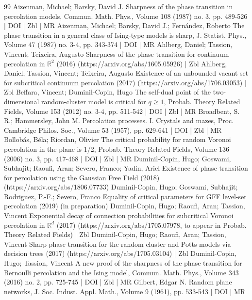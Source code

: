 \begin{thebibliography}{99}
Aizenman, Michael; Barsky, David J. Sharpness of the phase transition in percolation models, Commun. Math. Phys., Volume 108 (1987) no. 3, pp. 489-526 | DOI | Zbl | MR
Aizenman, Michael; Barsky, David J.; Fernández, Roberto The phase transition in a general class of Ising-type models is sharp, J. Statist. Phys., Volume 47 (1987) no. 3-4, pp. 343-374 | DOI | MR
Ahlberg, Daniel; Tassion, Vincent; Teixeira, Augusto Sharpness of the phase transition for continuum percolation in $\mathbb{R}^2$ (2016) (https://arxiv.org/abs/1605.05926) | Zbl
Ahlberg, Daniel; Tassion, Vincent; Teixeira, Augusto Existence of an unbounded vacant set for subcritical continuum percolation (2017) (https://arxiv.org/abs/1706.03053) | Zbl
Beffara, Vincent; Duminil-Copin, Hugo The self-dual point of the two-dimensional random-cluster model is critical for $q\ge 1$, Probab. Theory Related Fields, Volume 153 (2012) no. 3-4, pp. 511-542 | DOI | Zbl | MR
Broadbent, S. R.; Hammersley, John M. Percolation processes. I. Crystals and mazes, Proc. Cambridge Philos. Soc., Volume 53 (1957), pp. 629-641 | DOI | Zbl | MR
Bollobás, Béla; Riordan, Olivier The critical probability for random Voronoi percolation in the plane is 1/2, Probab. Theory Related Fields, Volume 136 (2006) no. 3, pp. 417-468 | DOI | Zbl | MR
Duminil-Copin, Hugo; Goswami, Subhajit; Raoufi, Aran; Severo, Franco; Yadin, Ariel Existence of phase transition for percolation using the Gaussian Free Field (2018) (https://arxiv.org/abs/1806.07733)
Duminil-Copin, Hugo; Goswami, Subhajit; Rodriguez, P.-F.; Severo, Franco Equality of critical parameters for GFF level-set percolation (2019) (in preparation)
Duminil-Copin, Hugo; Raoufi, Aran; Tassion, Vincent Exponential decay of connection probabilities for subcritical Voronoi percolation in $\mathbb{R}^d$ (2017) (https://arxiv.org/abs/1705.07978, to appear in Probab. Theory Related Fields) | Zbl
Duminil-Copin, Hugo; Raoufi, Aran; Tassion, Vincent Sharp phase transition for the random-cluster and Potts models via decision trees (2017) (https://arxiv.org/abs/1705.03104) | Zbl
Duminil-Copin, Hugo; Tassion, Vincent A new proof of the sharpness of the phase transition for Bernoulli percolation and the Ising model, Commun. Math. Phys., Volume 343 (2016) no. 2, pp. 725-745 | DOI | Zbl | MR
Gilbert, Edgar N. Random plane networks, J. Soc. Indust. Appl. Math., Volume 9 (1961), pp. 533-543 | DOI | MR

\end{thebibliography}
